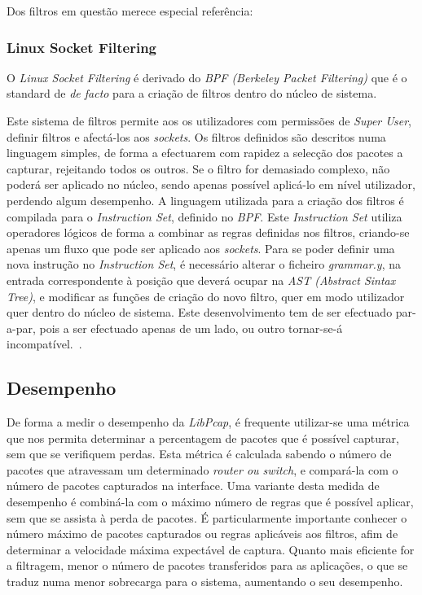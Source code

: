 Dos filtros em questão merece especial referência:

\subsubsection{Linux Socket Filtering}
O \textit{Linux Socket Filtering} é derivado do \textit{BPF (Berkeley Packet Filtering)} que é o standard de \textit{de facto} para a criação de filtros dentro do núcleo de sistema. 

Este sistema de filtros permite aos os utilizadores com permissões de \textit{Super User}, definir filtros e afectá-los aos \textit{sockets}.
Os filtros definidos são descritos numa linguagem simples, de forma a efectuarem com rapidez a selecção dos pacotes a capturar, rejeitando todos os outros.
Se o filtro for demasiado complexo, não poderá ser aplicado no núcleo, sendo apenas possível aplicá-lo em nível utilizador, perdendo algum desempenho.
A linguagem utilizada para a criação dos filtros é compilada para o \textit{Instruction Set}, definido no \textit{BPF}.
Este \textit{Instruction Set} utiliza operadores lógicos de forma a combinar as regras definidas nos filtros, criando-se apenas um fluxo que pode ser aplicado aos \textit{sockets}.
Para se poder definir uma nova instrução no \textit{Instruction Set}, é necessário alterar o ficheiro \textit{grammar.y}, na entrada correspondente à posição que deverá ocupar na \textit{AST (Abstract Sintax Tree)}, e modificar as funções de criação do novo filtro, quer em modo utilizador quer dentro do núcleo de sistema.
Este desenvolvimento tem de ser efectuado par-a-par, pois a ser efectuado apenas de um lado, ou outro tornar-se-á incompatível.~\cite{Mccanne92thebsd}.

\subsection{Desempenho}
De forma a medir o desempenho da \textit{LibPcap}, é frequente utilizar-se uma métrica que nos permita determinar a percentagem de pacotes que é possível capturar, sem que se verifiquem perdas.
Esta métrica é calculada sabendo o número de pacotes que atravessam um determinado \textit{router ou switch}, e compará-la com o número de pacotes capturados na interface.
Uma variante desta medida de desempenho é combiná-la com o máximo número de regras que é possível aplicar, sem que se assista à perda de pacotes.
É particularmente importante conhecer o número máximo de pacotes capturados ou regras aplicáveis aos filtros, afim de determinar a velocidade máxima expectável de captura.
Quanto mais eficiente for a filtragem, menor o número de pacotes transferidos para as aplicações, o que se traduz numa menor sobrecarga para o sistema, aumentando o seu desempenho.

